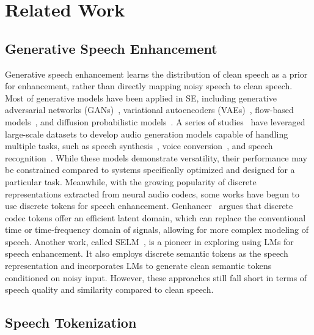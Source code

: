 \section{Related Work}
\subsection{Generative Speech Enhancement}
Generative speech enhancement learns the distribution of clean speech as a prior for enhancement, rather than directly mapping noisy speech to clean speech. Most of generative models have been applied in SE, including generative adversarial networks (GANs)~\citep{fu2019metricgan,liu2021voicefixer}, variational autoencoders (VAEs)~\citep{vae_ref1,vae_ref2}, flow-based models~\citep{flow_ref}, and diffusion probabilistic models~\citep{lemercier2023storm,tai2024dose,yang2024is_diffse,scheibler2024is_diffse}. 
A series of studies~\citep{le2024voicebox,yang2023uniaudio,wang2024speechx} have leveraged large-scale datasets to develop audio generation models capable of handling multiple tasks, such as speech synthesis~\citep{zhang2024speaking}, voice conversion~\citep{yao2024promptvc,yao2024stablevc}, and speech recognition~\citep{liu2024aligning}. While these models demonstrate versatility, their performance may be constrained compared to systems specifically optimized and designed for a particular task.
Meanwhile, with the growing popularity of discrete representations extracted from neural audio codecs, some works have begun to use discrete tokens for speech enhancement. 
Genhancer~\citep{yanggenhancer} argues that discrete codec tokens offer an efficient latent domain, which can replace the conventional time or time-frequency domain of signals, allowing for more complex modeling of speech.
Another work, called SELM~\citep{wang2024selm}, is a pioneer in exploring using LMs for speech enhancement. It also employs discrete semantic tokens as the speech representation and incorporates LMs to generate clean semantic tokens conditioned on noisy input. However, these approaches still fall short in terms of speech quality and similarity compared to clean speech. 



\subsection{Speech Tokenization}

